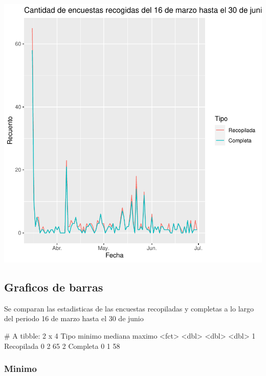 \documentclass{article}
\begin{document}
\includegraphics{seguimento2-030}

\subsection{Graficos de barras}
Se comparan las estadisticas de las encuestas recopiladas y completas a lo largo del periodo 16 de marzo hasta el 30 de junio

\begin{Schunk}
\begin{Soutput}
# A tibble: 2 x 4
  Tipo       minimo mediana maximo
  <fct>       <dbl>   <dbl>  <dbl>
1 Recopilada      0       2     65
2 Completa        0       1     58
\end{Soutput}
\end{Schunk}

\subsubsection{Minimo}
\end{document}
